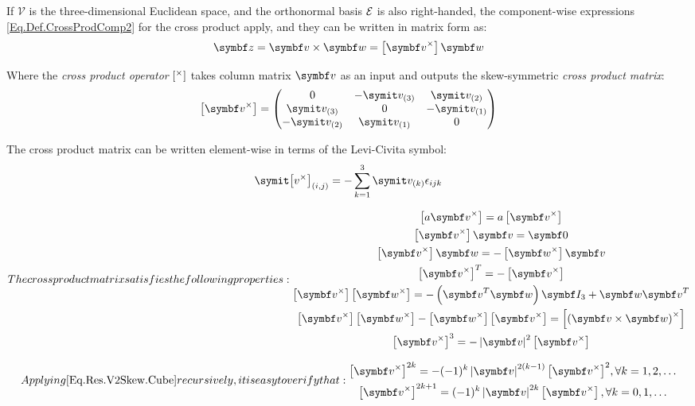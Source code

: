If $\mathcal{V}$ is the three-dimensional Euclidean space, and the orthonormal basis $\mathcal{E}_{ }$ is also right-handed, the component-wise expressions \eqref{Eq.Def.CrossProdComp2} for the cross product apply, and they can be written in matrix form as:
\begin{equation} \label{Eq.Def.VectColMat.CrossProd}
\mcol{z}= \mcol{v} \times \mcol{w} = \vskew{\mcol{v}} \mcol{w}
\end{equation}

Where the \emph{cross product operator} $\left[{{}}^{\times}\right]$ takes column matrix $\mcol{v}$ as an input and outputs the skew-symmetric \emph{cross product matrix}:
\begin{equation} \label{Eq.Def.V2Skew}
\vskew{\mcol{v}}=
\matenv
{
0				&-\cmp{v}{3}	&\cmp{v}{2}	\\
\cmp{v}{3}	&0				&-\cmp{v}{1}	\\
-\cmp{v}{2}	&\cmp{v}{1}	&0
}
\end{equation}

The cross product matrix can be written element-wise in terms of the Levi-Civita symbol:
\begin{equation} \label{Eq.Def.VectColMat.CrossProdLeviCivita}
\cmp{\vskew{v}}{i,j}=-\sum_{k=1}^{3}\cmp{v}{k} \epsilon_{ijk}
\end{equation}

\begin{subequations}
The cross product matrix satisfies the following properties:
\begin{gather}
\vskew{a\mcol{v}}= a\vskew{\mcol{v}} \label{Eq.Res.V2Skew.Homog}\\
\vskew{\mcol{v}}\mcol{v}=\nullv \label{Eq.Res.V2Skew.Self}\\
\vskew{\mcol{v}}\mcol{w}=-\vskew{\mcol{w}}\mcol{v} \label{Eq.Res.V2Skew.Rec} \\
\tr{\vskew{\mcol{v}}}=-\vskew{\mcol{v}} \label{Eq.Res.V2Skew.Transp} \\
\vskew{\mcol{v}}\vskew{\mcol{w}}=-\left(\tr{\mcol{v}}\mcol{w}\right)\IdM_{3}+\mcol{w}\tr{\mcol{v}} \label{Eq.Res.V2Skew.Prod} \\
\vskew{\mcol{v}}\vskew{\mcol{w}}-\vskew{\mcol{w}}\vskew{\mcol{v}}=\vskew{(\mcol{v}\times\mcol{w})} \label{Eq.Res.V2Skew.Cross}\\
\vskew{\mcol{v}}^3=-\norm{\mcol{v}}^2 \vskew{\mcol{v}} \label{Eq.Res.V2Skew.Cube}
\end{gather}
\end{subequations}

\begin{subequations}
Applying \eqref{Eq.Res.V2Skew.Cube} recursively, it is easy to verify that:
\begin{gather}
{\vskew{\mcol{v}}}^{2k} = -(-1)^k \norm{\mcol{v}}^{2(k-1)} {\vskew{\mcol{v}}}^2, \forall k=1,2,\dots \label{Eq.Res.RotVec.SkewEven}\\
{\vskew{\mcol{v}}}^{2k+1} = (-1)^k \norm{\mcol{v}}^{2k} \vskew{\mcol{v}}, \forall k=0,1,\dots \label{Eq.Res.RotVec.SkewOdd}
\end{gather}
\end{subequations}

